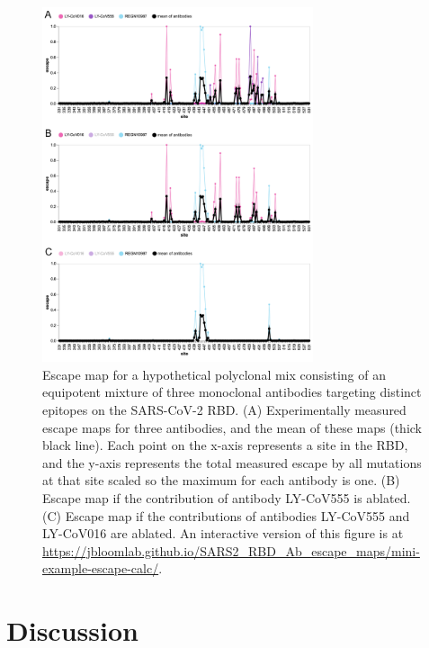 \documentclass[9pt,twocolumn,twoside]{gsajnl_modified}
\begin{document}
\begin{figure}
\includegraphics[width=0.71\textwidth]{figures/mini_example/mini_example.pdf} 

\caption{
Escape map for a hypothetical polyclonal mix consisting of an equipotent mixture of three monoclonal antibodies targeting distinct epitopes on the SARS-CoV-2 RBD.
(A) Experimentally measured escape maps for three antibodies, and the mean of these maps (thick black line).
Each point on the x-axis represents a site in the RBD, and the y-axis represents the total measured escape by all mutations at that site scaled so the maximum for each antibody is one.
(B) Escape map if the contribution of antibody LY-CoV555 is ablated.
(C) Escape map if the contributions of antibodies LY-CoV555 and LY-CoV016 are ablated.
An interactive version of this figure is at \url{https://jbloomlab.github.io/SARS2_RBD_Ab_escape_maps/mini-example-escape-calc/}.}
\label{fig:mini_example}
\end{figure}

\section{Discussion}
\end{document}
